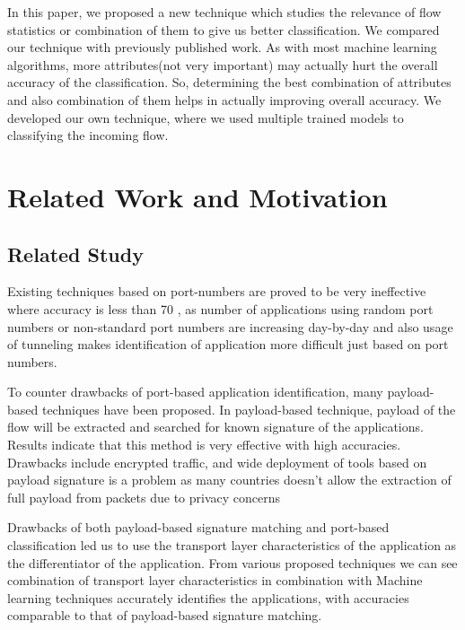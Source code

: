 \documentclass[conference]{IEEEtran}
\begin{document}
 In this paper, we proposed a new technique which studies the relevance of flow statistics or combination of them to give us better classification. We compared our technique with previously published work. As with most machine learning algorithms, more attributes(not very important) may actually hurt the overall accuracy of the classification. So, determining the best combination of attributes and also combination of them helps in actually improving overall accuracy. We developed our own technique, where we used multiple trained models to classifying the incoming flow.

\section{Related Work and Motivation}
\subsection{Related Study}
Existing techniques based on port-numbers are proved to be very ineffective where accuracy is less than 70 \cite{}, as number of applications using random port numbers or non-standard port numbers are increasing day-by-day and also usage of tunneling makes identification of application more difficult just based on port numbers. 

To counter drawbacks of port-based application identification, many payload-based techniques have been proposed\cite{}. In payload-based technique, payload of the flow will be extracted and searched for known signature of the applications. Results indicate that this method is very effective with high accuracies. Drawbacks include encrypted traffic, and wide deployment of tools based on payload signature is a problem as many countries doesn't allow the extraction of full payload from packets due to privacy concerns

Drawbacks of both payload-based signature matching and port-based classification led us to use the transport layer characteristics of the application as the differentiator of the application. From various proposed techniques\cite{} we can see combination of transport layer characteristics in combination with Machine learning techniques accurately identifies the applications, with accuracies comparable to that of payload-based signature matching.
\end{document}
